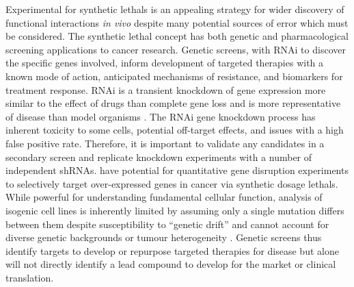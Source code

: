 Experimental  for \glspl{synthetic lethal} is an appealing strategy for wider discovery of functional interactions \textit{in vivo} despite many potential sources of error which must be considered. The \gls{synthetic lethal} concept has both genetic and pharmacological screening applications to cancer research. Genetic screens, with \gls{RNAi} to discover the specific genes involved, inform development of targeted therapies with a known mode of action, anticipated mechanisms of resistance, and biomarkers for treatment response. \gls{RNAi} is a transient knockdown of \gls{gene expression} more similar to the effect of drugs than complete gene loss and is more representative of disease than model organisms \citep{Bussey2006}. The \gls{RNAi} gene knockdown process has inherent toxicity to some cells, potential off-target effects, and issues with a high false positive rate. Therefore, it is important to validate any candidates in a secondary screen and replicate knockdown experiments with a number of independent \glspl{shRNA}. 
 have potential for quantitative gene disruption experiments to selectively target over-expressed genes in cancer via \glspl{synthetic dosage lethal}. While powerful for understanding fundamental cellular function, analysis of isogenic cell lines is inherently limited by assuming only a single \gls{mutation} differs between them despite susceptibility to ``genetic drift'' and cannot account for diverse genetic backgrounds or tumour heterogeneity \citep{Fece2015}. Genetic screens thus identify targets to develop or repurpose targeted therapies for disease but alone will not directly identify a lead compound to develop for the market or clinical translation.  

